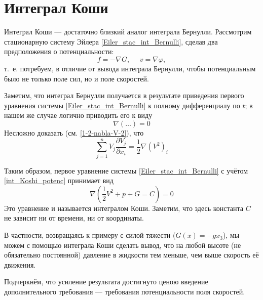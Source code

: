 \section{Интеграл Коши}

Интеграл Коши --- достаточно близкий аналог интеграла Бернулли.
Рассмотрим стационарную систему Эйлера \eqref{Eiler_stac_int_Bernulli},
сделав два предположения о потенциальности:
\begin{equation} \label{int_Koshi_potenc}
	f = -\nabla G,~~~~~~ v = \nabla \varphi,
\end{equation}
т.~е. потребуем, в отличие от вывода интеграла Бернулли,
чтобы потенциальным было не только поле сил, но и поле скоростей.

Заметим, что интеграл Бернулли получается в результате приведения первого уравнения системы
\eqref{Eiler_stac_int_Bernulli} к полному дифференциалу по $t$;
в нашем же случае логично приводить его к виду
$$
	\nabla(\dots) = 0
$$
Несложно доказать (см. \eqref{1-2-nabla-V-2}), что
$$
	\sum\limits_{j=1}^n V_j \frac{\partial V_j}{\partial x_i} = \frac{1}{2}\nabla(V^2)_i
$$

Таким образом, первое уравнение системы \eqref{Eiler_stac_int_Bernulli} с учётом \eqref{int_Koshi_potenc}
принимает вид
$$
	\nabla \left(
		\frac{1}{2}V^2 + p + G = C
	\right) = 0
$$
Это уравнение и называется интегралом Коши.
Заметим, что здесь константа $C$ не зависит ни от времени, ни от координаты.

В частности, возвращаясь к примеру с силой тяжести ($G(x) = -gx_3$),
мы можем с помощью интеграла Коши сделать вывод,
что на любой высоте (не обязательно постоянной) давление в жидкости тем меньше,
чем выше скорость её движения.

Подчеркнём, что усиление результата достигнуто ценою введение дополнительного требования ---
требования потенциальности поля скоростей.
